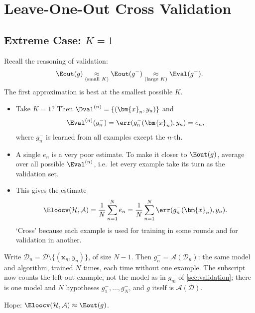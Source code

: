 \section{Leave-One-Out Cross Validation}\label{sec:loocv}


\subsection{Extreme Case: \texorpdfstring{\(K = 1\)}{K = 1}}

Recall the reasoning of validation:
\[
    \Eout(g) \underset{\text{(small } K)}{\approx} \Eout(g^-)
    \underset{\text{(large } K)}{\approx} \Eval(g^-) .
\]
The first approximation is best at the smallest possible \(K\).
\begin{itemize}
    \item Take \(K = 1\)? Then \(\Dval^{(n)} = \{(\bm{x}_n, y_n)\}\) and
        \[
            \Eval^{(n)}(g_n^-) = \err(g_n^-(\bm{x}_n), y_n) = e_n ,
        \]
        where \(g_n^-\) is learned from all examples except the \(n\)-th.
    \item A single \(e_n\) is a very poor estimate. To make it closer to
        \(\Eout(g)\), average over all possible \(\Eval^{(n)}\), i.e.\ let
        every example take its turn as the validation set.
    \item This gives the  estimate
        \[
            \Eloocv(\mathcal{H}, \mathcal{A}) = \frac{1}{N} \sum_{n=1}^{N} e_n
            = \frac{1}{N} \sum_{n=1}^{N} \err(g_n^-(\bm{x}_n), y_n) .
        \]
        `Cross' because each example is used for training in some rounds and
        for validation in another.
\end{itemize}

\begin{notation}
    Write \(\mathcal{D}_n = \mathcal{D} \setminus \{(\bm{x}_n, y_n)\}\), of size
    \(N - 1\). Then \(g_n^- = \mathcal{A}(\mathcal{D}_n)\): the same model and
    algorithm, trained \(N\) times, each time without one example. The
    subscript now counts the left-out example, not the model as in \(g_m^-\)
    of \autoref{sec:validation}; there is one model and \(N\) hypotheses
    \(g_1^-, \ldots, g_N^-\), and \(g\) itself is \(\mathcal{A}(\mathcal{D})\).
\end{notation}

\begin{moral}
    Hope: \(\Eloocv(\mathcal{H}, \mathcal{A}) \approx \Eout(g)\).
\end{moral}

